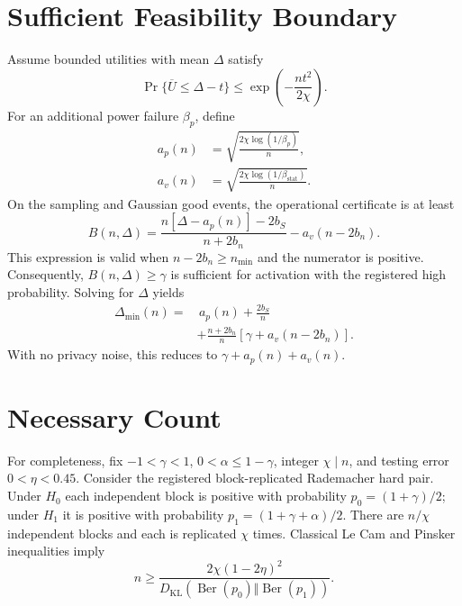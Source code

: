 \section{Sufficient Feasibility Boundary}
\label{app:feasibility}

Assume bounded utilities with mean $\Delta$ satisfy
\begin{equation}
 \Pr\{\overline U\leq\Delta-t\}
 \leq\exp\!\left(-\frac{nt^2}{2\chi}\right).
\end{equation}
For an additional power failure $\beta_p$, define
\begin{align}
 a_p(n)&=\sqrt{\frac{2\chi\log(1/\beta_p)}{n}},\\
 a_v(n)&=\sqrt{\frac{2\chi\log(1/\beta_{\mathrm{stat}})}{n}}.
\end{align}
On the sampling and Gaussian good events, the operational certificate is at
least
\begin{equation}
 B(n,\Delta)=
 \frac{n[\Delta-a_p(n)]-2b_S}{n+2b_n}
 -a_v(n-2b_n).
\end{equation}
This expression is valid when $n-2b_n\geq n_{\min}$ and the numerator is
positive. Consequently, $B(n,\Delta)\geq\gamma$ is sufficient for activation
with the registered high probability. Solving for $\Delta$ yields
\begin{align}
 \Delta_{\min}(n)
 =&\,a_p(n)+\frac{2b_S}{n}\\
 &+\frac{n+2b_n}{n}
 \left[\gamma+a_v(n-2b_n)\right].
\end{align}
With no privacy noise, this reduces to
$\gamma+a_p(n)+a_v(n)$.

\section{Necessary Count}
\label{app:lower}

For completeness, fix $-1<\gamma<1$, $0<\alpha\leq1-\gamma$, integer
$\chi\mid n$, and testing error $0<\eta<0.45$. Consider the registered
block-replicated Rademacher hard pair. Under $H_0$ each independent block is positive with probability
$p_0=(1+\gamma)/2$; under $H_1$ it is positive with probability
$p_1=(1+\gamma+\alpha)/2$. There are $n/\chi$ independent blocks and each is
replicated $\chi$ times. Classical Le Cam and Pinsker inequalities imply
\begin{equation}
 n\geq
 \frac{2\chi(1-2\eta)^2}
      {D_{\mathrm{KL}}(\operatorname{Ber}(p_0)
       \Vert\operatorname{Ber}(p_1))}.
\end{equation}

